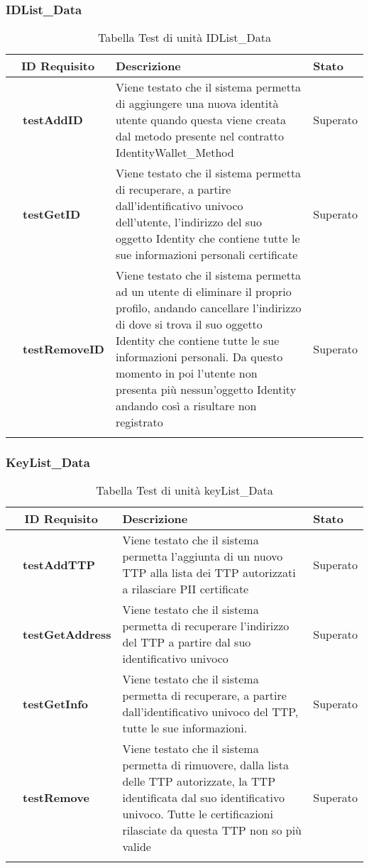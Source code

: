 \subsubsection{IDList\_Data}
\begin{longtable}{|r l|p{10cm}|p{2cm}|}
	\hline
	\multicolumn{2}{|c|}{\textbf{ID Requisito}} & \textbf{Descrizione} & \textbf{Stato}\tabularnewline
	\hline
	&\textbf{testAddID}&Viene testato che il sistema permetta di aggiungere una nuova identità utente quando questa viene creata dal metodo presente nel contratto IdentityWallet\_Method& Superato\\\hline
	&\textbf{testGetID}&Viene testato che il sistema permetta di recuperare, a partire dall'identificativo univoco dell'utente, l'indirizzo del suo oggetto Identity che contiene tutte le sue informazioni personali certificate& Superato\\\hline
	&\textbf{testRemoveID}&Viene testato che il sistema permetta ad un utente di eliminare il proprio profilo, andando cancellare l'indirizzo di dove si trova il suo oggetto Identity che contiene tutte le sue informazioni personali.
	Da questo momento in poi l'utente non presenta più nessun'oggetto Identity andando così a risultare non registrato
	& Superato\\\hline
	\caption{Tabella Test di unità IDList\_Data}
\end{longtable}
\subsubsection{KeyList\_Data}
\begin{longtable}{|r l|p{10cm}|p{2cm}|}
	\hline
	\multicolumn{2}{|c|}{\textbf{ID Requisito}} & \textbf{Descrizione} & \textbf{Stato}\tabularnewline
	\hline
	&\textbf{testAddTTP}&Viene testato che il sistema permetta l'aggiunta di un nuovo \gls{TTP} alla lista dei \gls{TTP} autorizzati a rilasciare \gls{PII} certificate& Superato\\\hline
	&\textbf{testGetAddress}&Viene testato che il sistema permetta di recuperare l'indirizzo del \gls{TTP} a partire dal suo identificativo univoco& Superato\\\hline
	&\textbf{testGetInfo}&Viene testato che il sistema permetta di recuperare, a partire dall'identificativo univoco del \gls{TTP}, tutte le sue informazioni.& Superato\\\hline
	&\textbf{testRemove}&Viene testato che il sistema permetta di rimuovere, dalla lista delle \gls{TTP} autorizzate, la \gls{TTP} identificata dal suo identificativo univoco. Tutte le certificazioni rilasciate da questa \gls{TTP} non so più valide& Superato\\\hline
	\caption{Tabella Test di unità keyList\_Data}
\end{longtable}
